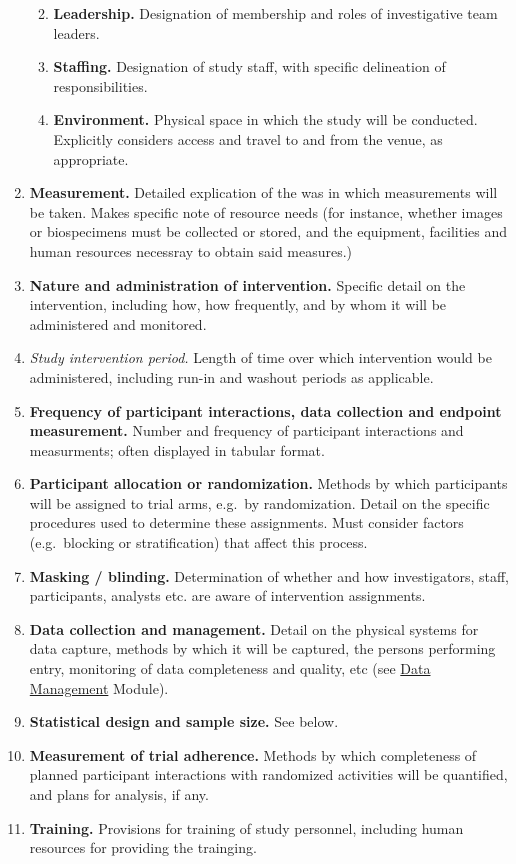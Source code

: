 \documentclass[]{book}
\providecommand{\tightlist}{%
  \setlength{\itemsep}{0pt}\setlength{\parskip}{0pt}}
\theoremstyle{definition}
\theoremstyle{definition}
\theoremstyle{definition}
\theoremstyle{remark}
\begin{document}
\begin{enumerate}
  \begin{enumerate}
  \def\labelenumii{\roman{enumii}.}
  \tightlist
  \item
    \textbf{Leadership.} Designation of membership and roles of
    investigative team leaders.
  \item
    \textbf{Staffing.} Designation of study staff, with specific
    delineation of responsibilities.
  \item
    \textbf{Environment.} Physical space in which the study will be
    conducted. Explicitly considers access and travel to and from the
    venue, as appropriate.
  \end{enumerate}
\item
  \textbf{Measurement.} Detailed explication of the was in which
  measurements will be taken. Makes specific note of resource needs (for
  instance, whether images or biospecimens must be collected or stored,
  and the equipment, facilities and human resources necessray to obtain
  said measures.)
\item
  \textbf{Nature and administration of intervention.} Specific detail on
  the intervention, including how, how frequently, and by whom it will
  be administered and monitored.
\item
  \emph{Study intervention period.} Length of time over which
  intervention would be administered, including run-in and washout
  periods as applicable.
\item
  \textbf{Frequency of participant interactions, data collection and
  endpoint measurement.} Number and frequency of participant
  interactions and measurments; often displayed in tabular format.
\item
  \textbf{Participant allocation or randomization.} Methods by which
  participants will be assigned to trial arms, e.g.~by randomization.
  Detail on the specific procedures used to determine these assignments.
  Must consider factors (e.g.~blocking or stratification) that affect
  this process.
\item
  \textbf{Masking / blinding.} Determination of whether and how
  investigators, staff, participants, analysts etc. are aware of
  intervention assignments.
\item
  \textbf{Data collection and management.} Detail on the physical
  systems for data capture, methods by which it will be captured, the
  persons performing entry, monitoring of data completeness and quality,
  etc (see
  \href{https://ifar-isac.github.io/book/data-management.html}{Data
  Management} Module).
\item
  \textbf{Statistical design and sample size.} See below.
\item
  \textbf{Measurement of trial adherence.} Methods by which completeness
  of planned participant interactions with randomized activities will be
  quantified, and plans for analysis, if any.
\item
  \textbf{Training.} Provisions for training of study personnel,
  including human resources for providing the trainging.
\end{enumerate}
\end{document}

